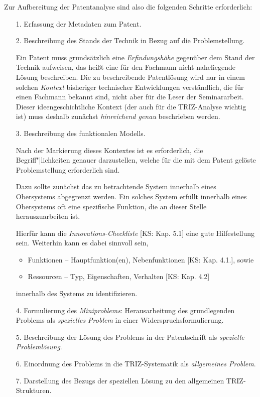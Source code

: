 \documentclass[11pt,a4paper]{article}
\begin{document}
Zur Aufbereitung der Patentanalyse sind also die folgenden Schritte
erforderlich:
\begin{itemize}
\item[1.] Erfassung der Metadaten zum Patent.
  
\item[2.] Beschreibung des Stands der Technik in Bezug auf die
  Problemstellung.

  Ein Patent muss grundsätzlich eine \emph{Erfindungshöhe} gegenüber dem Stand
  der Technik aufweisen, das heißt eine für den Fachmann nicht naheliegende
  Lösung beschreiben.  Die zu beschreibende Patentlösung wird nur in einem
  solchen \emph{Kontext} bisheriger technischer Entwicklungen verständlich,
  die für einen Fachmann bekannt sind, nicht aber für die Leser der
  Seminararbeit.  Dieser ideengeschichtliche Kontext (der auch für die
  TRIZ-Analyse wichtig ist) muss deshalb zunächst \emph{hinreichend genau}
  beschrieben werden.

\item[3.] Beschreibung des funktionalen Modells.

  Nach der Markierung dieses Kontextes ist es erforderlich, die
  Begriff"|lichkeiten genauer darzustellen, welche für die mit dem Patent
  gelöste Problemstellung erforderlich sind. 

  Dazu sollte zunächst das zu betrachtende System innerhalb eines Obersystems
  abgegrenzt werden. Ein solches System erfüllt innerhalb eines Obersystems
  oft eine spezifische Funktion, die an dieser Stelle herauszuarbeiten ist. 
  
  Hierfür kann die \emph{Innovations-Checkliste} [KS: Kap. 5.1] eine gute
  Hilfestellung sein.  Weiterhin kann es dabei sinnvoll sein,
  \begin{itemize}
  \item Funktionen -- Hauptfunktion(en), Nebenfunktionen [KS: Kap. 4.1.],
    sowie 
  \item Ressourcen -- Typ, Eigenschaften, Verhalten [KS: Kap. 4.2]
  \end{itemize}
  innerhalb des Systems zu identifizieren. 

\item[4.] Formulierung des \emph{Miniproblems}: Herausarbeitung des
  grundlegenden Problems als \emph{spezielles Problem} in einer
  Widerspruchsformulierung.

\item[5.] Beschreibung der Lösung des Problems in der Patentschrift als
  \emph{spezielle Problemlösung}.

\item[6.] Einordnung des Problems in die TRIZ-Systematik als \emph{allgemeines
  Problem}. 

\item[7.] Darstellung des Bezugs der speziellen Lösung zu den allgemeinen
  TRIZ-Strukturen. 
\end{itemize}
\end{document}
